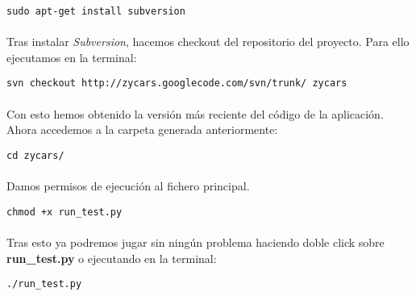 \begin{lstlisting}[style=consola, numbers=none]
sudo apt-get install subversion
\end{lstlisting}

\paragraph{}
Tras instalar \emph{Subversion}, hacemos checkout del repositorio del proyecto. Para ello ejecutamos en la terminal:

\begin{lstlisting}[style=consola, numbers=none]
svn checkout http://zycars.googlecode.com/svn/trunk/ zycars
\end{lstlisting}

\paragraph{}
Con esto hemos obtenido la versión más reciente del código de la aplicación. Ahora accedemos a la carpeta generada
anteriormente:

\begin{lstlisting}[style=consola, numbers=none]
cd zycars/
\end{lstlisting}

\paragraph{}
Damos permisos de ejecución al fichero principal.

\begin{lstlisting}[style=consola, numbers=none]
chmod +x run_test.py
\end{lstlisting}

\paragraph{}
Tras esto ya podremos jugar sin ningún problema haciendo doble click sobre \textbf{run\_test.py} o ejecutando en la terminal:
\begin{lstlisting}[style=consola, numbers=none]
./run_test.py
\end{lstlisting}


